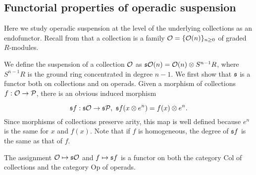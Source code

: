 \documentclass[Thesis.tex]{subfiles}
\begin{document}
\subsection{Functorial properties of operadic suspension}\label{functorial}


Here we study operadic suspension at the level of the underlying collections as an endofunctor. Recall from  that a collection is a family ${\mathcal O}=\{{\mathcal O}(n)\}_{n\geq 0}$ of graded $R$-modules.

We define the suspension of a collection ${\mathcal O}$ as $\mathfrak{s}{\mathcal O}(n)={\mathcal O}(n)\otimes S^{n-1}R$, where $S^{n-1}R$ is the ground ring concentrated in degree $n-1$. We first show that $\mathfrak{s}$ is a functor both on collections and on operads. %
Given a morphism of collections $f:{\mathcal O}\to\mathcal{P}$, there is an obvious induced morphism

\begin{equation}\label{sf}
\mathfrak{s} f:\mathfrak{s}{\mathcal O}\to\mathfrak{s}\mathcal{P},\ \mathfrak{s} f(x\otimes e^n)=f(x)\otimes e^n.
\end{equation}
Since morphisms of collections preserve arity, this map is well defined because $e^n$ is the same for $x$ and $f(x)$. Note that if $f$ is homogeneous, the degree of $\mathfrak{s} f$ is the same as that of $f$.

\begin{lem}
The assignment ${\mathcal O}\mapsto \mathfrak{s}{\mathcal O}$ and $f\mapsto \mathfrak{s} f$ is a functor on both the category $\mathrm{Col}$ of collections and the category $\mathrm{Op}$ of operads.
\end{lem}
\end{document}
